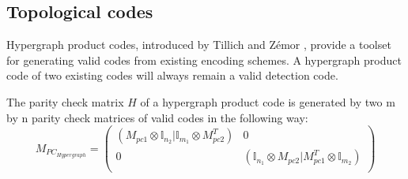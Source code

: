 \subsection{Topological codes}
Hypergraph product codes, introduced by Tillich and Z\'emor \cite{tillichzemor},
provide a toolset for generating valid codes
from existing encoding schemes.
A hypergraph product code of two
existing codes will always remain a valid detection code.

The parity check matrix $H$ of a hypergraph product code is generated
by two m by n parity check matrices of valid codes in the following
way:
\begin{equation}
	M_{PC_{Hypergraph}} = \left(\begin{array}{cc}
		\left(M_{pc1} \otimes \mathbb{I}_{n_2}| 
        \mathbb{I}_{m_1} \otimes M_{pc2}^T \right) & 0 \\
		0 & \left(\mathbb{I}_{n_1}\otimes 
        M_{pc2} | M_{pc1}^T \otimes \mathbb{I}_{m_2}\right)\\
	\end{array}\right)
\end{equation}






